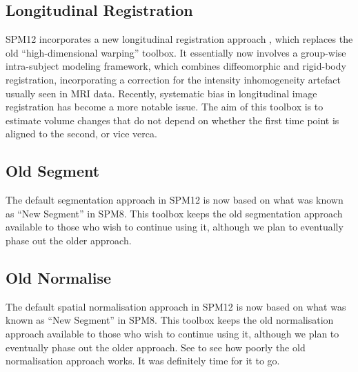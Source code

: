 \documentclass[a4paper,titlepage,openany]{article}
\begin{document}
\subsection{Longitudinal Registration}
SPM12 incorporates a new longitudinal registration approach \cite{ashburner2013symmetric}, which replaces the old ``high-dimensional warping'' toolbox.
It essentially now involves a group-wise intra-subject modeling framework, which combines diffeomorphic \cite{ashburner2011diffeomorphic} and rigid-body registration, incorporating a correction for the intensity inhomogeneity artefact usually seen in MRI data.
Recently, systematic bias in longitudinal image registration has become a more notable issue.
The aim of this toolbox is to estimate volume changes that do not depend on whether the first time point is aligned to the second, or vice verca.

\subsection{Old Segment}
The default segmentation approach in SPM12 is now based on what was known as ``New Segment'' in SPM8.
This toolbox keeps the old segmentation approach available to those who wish to continue using it, although we plan to eventually phase out the older approach.

\subsection{Old Normalise}
The default spatial normalisation approach in SPM12 is now based on what was known as ``New Segment'' in SPM8.
This toolbox keeps the old normalisation approach available to those who wish to continue using it, although we plan to eventually phase out the older approach.
See \cite{klein_evaluation} to see how poorly the old normalisation approach works.
It was definitely time for it to go.




\end{document}
